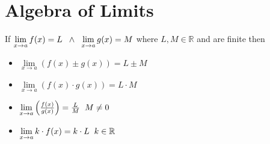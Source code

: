 \documentclass{article}
\begin{document}
\section{Algebra of Limits}
If $\lim\limits_{x \to a}{f(x)}=L \hspace{2mm} \land \hspace{2mm} \lim\limits_{x \to a}{g(x)}=M$ where $L,M \in \mathbb{R}$ and are finite
\newline then \begin{itemize}
    \item $\lim\limits_{x \to a}{\left(f(x)\pm g(x)\right)}=L\pm M$
    \item $\lim\limits_{x \to a}{\left(f(x)\cdot g(x)\right)}=L\cdot M$
    \item $\lim\limits_{x \to a}{\left(\frac{f(x)}{g(x)}\right)}=\frac{L}{M} \hspace{2mm} M \not= 0$
    \item $\lim\limits_{x \to a}{k\cdot f(x)}=k\cdot L \hspace{2mm} k \in \mathbb{R}$
\end{itemize}
\end{document}
